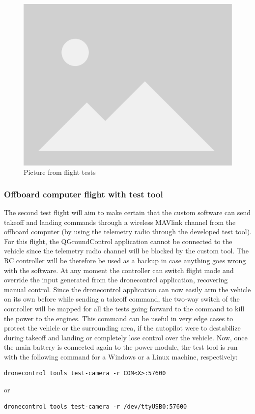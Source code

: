 \begin{figure}
  \centering
  \includegraphics[width=.6\textwidth, keepaspectratio]{img/placeholder.png}
  \caption{Picture from flight tests}\label{fig:flight-test-basic}
\end{figure}

\subsubsection{Offboard computer flight with test tool}
\label{subsec:fl-test-2}

The second test flight will aim to make certain that the custom software can send takeoff and landing commands through a wireless MAVlink channel from the offboard computer (by using the telemetry radio through the developed test tool).
For this flight, the QGroundControl application cannot be connected to the vehicle since the telemetry radio channel will be blocked by the custom tool.
The RC controller will be therefore be used as a backup in case anything goes wrong with the software.
At any moment the controller can switch flight mode and override the input generated from the dronecontrol application, recovering manual control.
Since the dronecontrol application can now easily arm the vehicle on its own before while sending a takeoff command,
the two-way switch of the controller will be mapped for all the tests going forward to the command to kill the power to the engines.
This command can be useful in very edge cases to protect the vehicle or the surrounding area, if the autopilot were to destabilize during takeoff and landing or completely lose control over the vehicle.
Now, once the main battery is connected again to the power module, the test tool is run with the following command for a Windows or a Linux machine, respectively:
\begin{verbatim}
dronecontrol tools test-camera -r COM<X>:57600
\end{verbatim}
or
\begin{verbatim}
dronecontrol tools test-camera -r /dev/ttyUSB0:57600
\end{verbatim}

